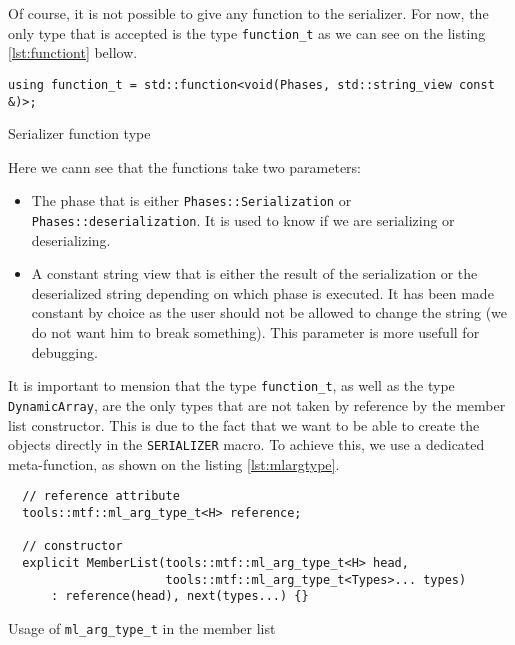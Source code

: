 Of course, it is not possible to give any function to the serializer. For now,
the only type that is accepted is the type \texttt{function\_t} as we can see on
the listing \ref{lst:functiont} bellow.

\begin{listing}[ht!]
\begin{verbatim}
using function_t = std::function<void(Phases, std::string_view const &)>;
\end{verbatim}
\caption{Serializer function type}
\label{lst:functiont}
\end{listing}

Here we cann see that the functions take two parameters:

\begin{itemize}
  \item The phase that is either \texttt{Phases::Serialization} or
    \texttt{Phases::deserialization}. It is used to know if we are serializing
    or deserializing.
  \item A constant string view that is either the result of the serialization or
    the deserialized string depending on which phase is executed. It has been
    made constant by choice as the user should not be allowed to change the
    string (we do not want him to break something). This parameter is more
    usefull for debugging.
\end{itemize}

It is important to mension that the type \texttt{function\_t}, as well as the
type \texttt{DynamicArray}, are the only types that are not taken by reference
by the member list constructor. This is due to the fact that we want to be able
to create the objects directly in the \texttt{SERIALIZER} macro. To achieve
this, we use a dedicated meta-function, as shown on the listing
\ref{lst:mlargtype}.

\begin{listing}[ht!]
\begin{verbatim}
  // reference attribute
  tools::mtf::ml_arg_type_t<H> reference;

  // constructor
  explicit MemberList(tools::mtf::ml_arg_type_t<H> head,
                      tools::mtf::ml_arg_type_t<Types>... types)
      : reference(head), next(types...) {}
\end{verbatim}
\caption{Usage of \texttt{ml\_arg\_type\_t} in the member list}
\label{lst:mlargtype}
\end{listing}

